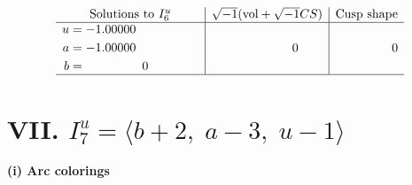 \documentclass[1p]{elsarticle_modified}
\theoremstyle{definition}
\newcommand{\I}{\sqrt{-1}}
\begin{document}
$$\begin{array}{c|c|c}  
\text{Solutions to }I^u_{6}& \I (\text{vol} + \sqrt{-1}CS) & \text{Cusp shape}\\
 \hline 
\begin{aligned}
u &= -1.00000\phantom{ +0.000000I} \\
a &= -1.00000\phantom{ +0.000000I} \\
b &= \phantom{-0.000000 } 0\end{aligned}
 & \phantom{-0.000000 } 0 & \phantom{-0.000000 } 0\\
 \hline 
 \end{array}$$\newpage\newpage\renewcommand{\arraystretch}{1}
\centering \section*{VII. $I^u_{7}= \langle b+2,\;a-3,\;u-1 \rangle$}
\flushleft \textbf{(i) Arc colorings}\\
\end{document}
